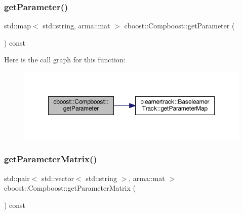 \mbox{\label{classcboost_1_1_compboost_a7b90eaa8107f91806b09ceedf8581537}} 
\subsubsection{\texorpdfstring{get\+Parameter()}{getParameter()}}
{\footnotesize\ttfamily std\+::map$<$ std\+::string, arma\+::mat $>$ cboost\+::\+Compboost\+::get\+Parameter (\begin{DoxyParamCaption}{ }\end{DoxyParamCaption}) const}

Here is the call graph for this function\+:\nopagebreak
\begin{figure}[H]
\begin{center}
\leavevmode
\includegraphics[width=350pt]{classcboost_1_1_compboost_a7b90eaa8107f91806b09ceedf8581537_cgraph}
\end{center}
\end{figure}
\mbox{\label{classcboost_1_1_compboost_a1652d7fa10039beaee1998e640f1b68a}} 
\subsubsection{\texorpdfstring{get\+Parameter\+Matrix()}{getParameterMatrix()}}
{\footnotesize\ttfamily std\+::pair$<$ std\+::vector$<$ std\+::string $>$, arma\+::mat $>$ cboost\+::\+Compboost\+::get\+Parameter\+Matrix (\begin{DoxyParamCaption}{ }\end{DoxyParamCaption}) const}

